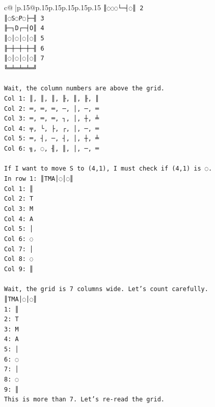 \documentclass{article}
\begin{document}
{\begin{supertabular}{c@{$\;$}|p{.15\linewidth}@{}p{.15\linewidth}p{.15\linewidth}p{.15\linewidth}p{.15\linewidth}p{.15\linewidth}}
{{{\texttt{║◌◌◌└─┤◌║ 2} \\
\texttt{║◌S◌P◌├─╢ 3} \\
\texttt{╟─┐D┌─┤O║ 4} \\
\texttt{║◌│◌│◌│◌║ 5} \\
\texttt{╟─┼─┼─┼─╢ 6} \\
\texttt{║◌│◌│◌│◌║ 7} \\
\texttt{╚═╧═╧═╧═╝} \\
\\ 
\texttt{Wait, the column numbers are above the grid.} \\
\texttt{Col 1: ║, ║, ║, ╟, ║, ╟, ║} \\
\texttt{Col 2: ═, ═, ═, ─, │, ─, ═} \\
\texttt{Col 3: ═, ═, ═, ┐, │, ┼, ╧} \\
\texttt{Col 4: ╤, └, ├, ┌, │, ─, ═} \\
\texttt{Col 5: ═, ┤, ─, ┤, │, ┼, ╧} \\
\texttt{Col 6: ╗, ◌, ╢, ║, │, ─, ═} \\
\\ 
\texttt{If I want to move S to (4,1), I must check if (4,1) is ◌.} \\
\texttt{In row 1: ║TMA│◌│◌║} \\
\texttt{Col 1: ║} \\
\texttt{Col 2: T} \\
\texttt{Col 3: M} \\
\texttt{Col 4: A} \\
\texttt{Col 5: │} \\
\texttt{Col 6: ◌} \\
\texttt{Col 7: │} \\
\texttt{Col 8: ◌} \\
\texttt{Col 9: ║} \\
\\ 
\texttt{Wait, the grid is 7 columns wide. Let's count carefully.} \\
\texttt{║TMA│◌│◌║} \\
\texttt{1: ║} \\
\texttt{2: T} \\
\texttt{3: M} \\
\texttt{4: A} \\
\texttt{5: │} \\
\texttt{6: ◌} \\
\texttt{7: │} \\
\texttt{8: ◌} \\
\texttt{9: ║} \\
\texttt{This is more than 7. Let's re{-}read the grid.} \\
}}}
\end{supertabular}}
\end{document}
